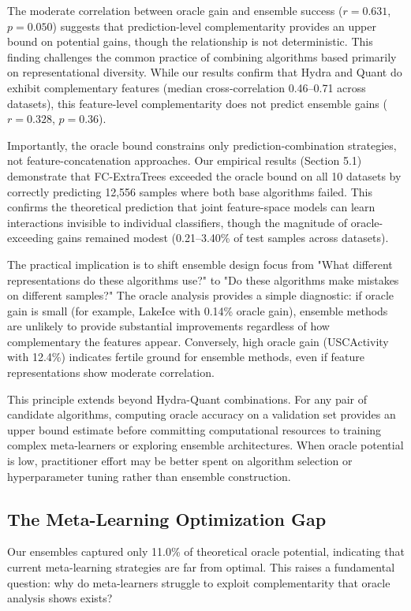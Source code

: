 \documentclass[pdflatex,sn-basic]{sn-jnl}           %
\theoremstyle{thmstyleone}%
\theoremstyle{thmstyletwo}%
\theoremstyle{thmstylethree}%
\begin{document}
The moderate correlation between oracle gain and ensemble success ($r=0.631$, $p=0.050$) suggests that prediction-level complementarity provides an upper bound on potential gains, though the relationship is not deterministic. This finding challenges the common practice of combining algorithms based primarily on representational diversity. While our results confirm that Hydra and Quant do exhibit complementary features (median cross-correlation 0.46--0.71 across datasets), this feature-level complementarity does not predict ensemble gains ($r=0.328$, $p=0.36$).

Importantly, the oracle bound constrains only prediction-combination strategies, not feature-concatenation approaches. Our empirical results (Section 5.1) demonstrate that FC-ExtraTrees exceeded the oracle bound on all 10 datasets by correctly predicting 12,556 samples where both base algorithms failed. This confirms the theoretical prediction that joint feature-space models can learn interactions invisible to individual classifiers, though the magnitude of oracle-exceeding gains remained modest (0.21--3.40\% of test samples across datasets).

The practical implication is to shift ensemble design focus from "What different representations do these algorithms use?" to "Do these algorithms make mistakes on different samples?" The oracle analysis provides a simple diagnostic: if oracle gain is small (for example, LakeIce with 0.14\% oracle gain), ensemble methods are unlikely to provide substantial improvements regardless of how complementary the features appear. Conversely, high oracle gain (USCActivity with 12.4\%) indicates fertile ground for ensemble methods, even if feature representations show moderate correlation.

This principle extends beyond Hydra-Quant combinations. For any pair of candidate algorithms, computing oracle accuracy on a validation set provides an upper bound estimate before committing computational resources to training complex meta-learners or exploring ensemble architectures. When oracle potential is low, practitioner effort may be better spent on algorithm selection or hyperparameter tuning rather than ensemble construction.

\subsection{The Meta-Learning Optimization Gap}

Our ensembles captured only 11.0\% of theoretical oracle potential, indicating that current meta-learning strategies are far from optimal. This raises a fundamental question: why do meta-learners struggle to exploit complementarity that oracle analysis shows exists?
\end{document}
